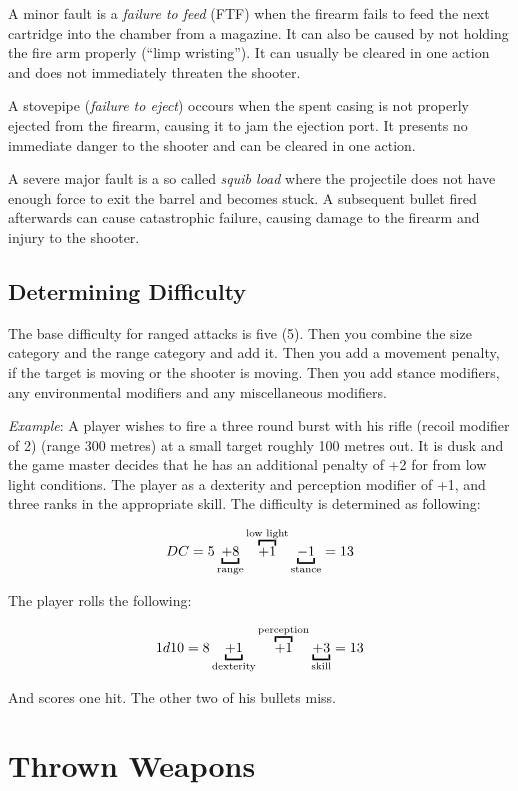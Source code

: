 A minor fault is a \emph{failure to feed} (FTF) when the firearm fails to feed
the next cartridge into the chamber from a magazine. It can also be caused by
not holding the fire arm properly (``limp wristing''). It can usually be cleared
in one action and does not immediately threaten the shooter.

A stovepipe (\emph{failure to eject}) occours when the spent casing is not
properly ejected from the firearm, causing it to jam the ejection port. It
presents no immediate danger to the shooter and can be cleared in one action.

A severe major fault is a so called \emph{squib load} where the projectile does
not have enough force to exit the barrel and becomes stuck. A subsequent bullet
fired afterwards can cause catastrophic failure, causing damage to the firearm
and injury to the shooter.

\subsection{Determining Difficulty}
\label{sub:7-Determining Difficulty}

The base difficulty for ranged attacks is five (5). Then you combine the size
category and the range category and add it. Then you add a movement penalty,
if the target is moving or the shooter is moving. Then you add stance modifiers,
any environmental modifiers and any miscellaneous modifiers.

\emph{Example}: A player wishes to fire a three round burst with his rifle
(recoil modifier of 2) (range 300 metres) at a small target roughly 100 metres
out. It is dusk and the game master decides that he has an additional penalty
of +2 for from low light conditions. The player as a dexterity and perception
modifier of +1, and three ranks in the appropriate skill. The difficulty is
determined as following:

\[
DC = 5 \ub{+ 8}{range} \ob{+ 1}{low light} \ub{- 1}{stance} = 13
\]

The player rolls the following:

\[
1d10 = 8 \ub{+ 1}{dexterity} \ob{+ 1}{perception} \ub{+ 3}{skill} = 13
\]

And scores one hit. The other two of his bullets miss.

\section{Thrown Weapons}
\label{sec:7-Thrown Weapons}


